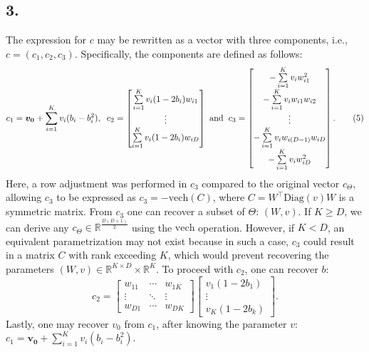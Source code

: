 \documentclass[a4paper, 12pt]{article}
\begin{document}
\subsection*{3.}
The expression for \( c\) may be rewritten as a vector with three components, i.e., \( c = (c_1, c_2, c_3) \). Specifically, the components are defined as follows:
\[
c_1 = \boldsymbol{v_0} + \sum\limits_{i=1}^{K} v_i (b_i - b_i^2), \hspace{0.2cm}
c_2 =
\begin{bmatrix}
    \sum\limits_{i=1}^{K} v_i (1 - 2b_i) w_{i1} \\
    \vdots \\
    \sum\limits_{i=1}^{K} v_i (1 - 2b_i) w_{iD} \\
\end{bmatrix} \text{ and} \hspace{0.2cm}
c_3 = 
\begin{bmatrix}
    -\sum\limits_{i=1}^{K}v_i w_{i1}^{2} \\
    -\sum\limits_{i=1}^{K} v_i w_{i1}w_{i2} \\
    \vdots \\
    -\sum\limits_{i=1}^{K}v_iw_{i(D-1)}w_{iD} \\
    -\sum\limits_{i=1}^{K}v_i w_{iD}^{2}
\end{bmatrix}.
\tag{5}
\]
Here, a row adjustment was performed in \( c_3 \) compared to the original vector \( c_\Theta \), allowing \( c_3 \) to be expressed as \( c_3 = -\text{vech}(C) \), where \( C = W^\top \text{Diag}(v)W \) is a symmetric matrix. From $c_3$ one can recover a subset of $\Theta$: $(W,v)$. If \( K \geq D \), we can derive any \( c_{\Theta} \in \mathbb{R}^{\frac{D(D+1)}{2}} \) using the \(\text{vech}\) operation. However, if \( K < D \), an equivalent parametrization may not exist because in such a case, \(c_3\) could result in a matrix \( C \) with rank exceeding \( K \), which would prevent recovering the parameters \( (W, v) \in \mathbb{R}^{K \times D} \times \mathbb{R}^K \). To proceed with $c_2$, one can recover $b$: 
\[
c_2 = \begin{bmatrix}
w_{11} & \cdots & w_{1K}  \\
\vdots & \ddots & \vdots \\
w_{D1} & \cdots & w_{DK}
\end{bmatrix}
\begin{bmatrix}
    v_1(1-2b_1) \\
    \vdots \\
    v_K(1-2b_k)
\end{bmatrix}.
\tag{6}
\]
Lastly, one may recover $v_0$ from $c_1$, after knowing the parameter $v$: $c_1 = \boldsymbol{v_0} + \sum\limits_{i=1}^{K} v_i (b_i - b_i^2)$.
 
\end{document}
